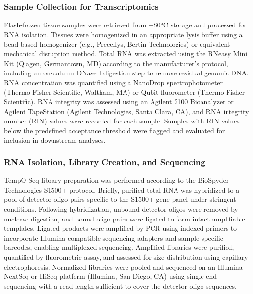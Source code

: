 \subsubsection{Sample Collection for Transcriptomics}

Flash-frozen tissue samples were retrieved from −80°C storage and processed for RNA isolation. Tissues were homogenized in an appropriate lysis buffer using a bead-based homogenizer (e.g., Precellys, Bertin Technologies) or equivalent mechanical disruption method. Total RNA was extracted using the RNeasy Mini Kit (Qiagen, Germantown, MD) according to the manufacturer's protocol, including an on-column DNase I digestion step to remove residual genomic DNA. RNA concentration was quantified using a NanoDrop spectrophotometer (Thermo Fisher Scientific, Waltham, MA) or Qubit fluorometer (Thermo Fisher Scientific). RNA integrity was assessed using an Agilent 2100 Bioanalyzer or Agilent TapeStation (Agilent Technologies, Santa Clara, CA), and RNA integrity number (RIN) values were recorded for each sample. Samples with RIN values below the predefined acceptance threshold were flagged and evaluated for inclusion in downstream analyses.

\subsubsection{RNA Isolation, Library Creation, and Sequencing}

TempO-Seq library preparation was performed according to the BioSpyder Technologies S1500+ protocol. Briefly, purified total RNA was hybridized to a pool of detector oligo pairs specific to the S1500+ gene panel under stringent conditions. Following hybridization, unbound detector oligos were removed by nuclease digestion, and bound oligo pairs were ligated to form intact amplifiable templates. Ligated products were amplified by PCR using indexed primers to incorporate Illumina-compatible sequencing adapters and sample-specific barcodes, enabling multiplexed sequencing. Amplified libraries were purified, quantified by fluorometric assay, and assessed for size distribution using capillary electrophoresis. Normalized libraries were pooled and sequenced on an Illumina NextSeq or HiSeq platform (Illumina, San Diego, CA) using single-end sequencing with a read length sufficient to cover the detector oligo sequences.

